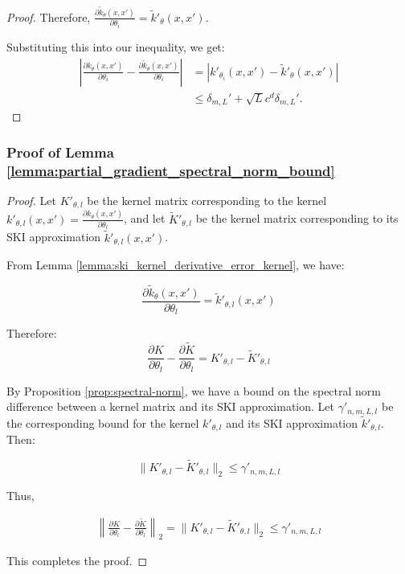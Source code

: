 \begin{proof}
Therefore, $\frac{\partial \tilde{k}_{\theta}(x,x')}{\partial \theta_i} = \tilde{k}'_{\theta}(x, x')$.

Substituting this into our inequality, we get:
\begin{align*}
\left\vert \frac{\partial k_{\theta}(x,x')}{\partial \theta_i}-\frac{\partial \tilde{k}_{\theta}(x,x')}{\partial \theta_i}\right\vert &= \left\vert k'_{\theta_i}(x, x') - \tilde{k}'_{\theta}(x, x') \right\vert \\
&\leq \delta_{m,L}'+\sqrt{L}c^d\delta_{m,L}'.
\end{align*}

\end{proof}

\subsubsection{Proof of Lemma \ref{lemma:partial_gradient_spectral_norm_bound}}\label{section:proof_partial_gradient_spectral_norm_bound}
\partialgradientspectralnormbound*
\begin{proof}
Let $K'_{\theta,l}$ be the kernel matrix corresponding to the kernel $k'_{\theta,l}(x,x') = \frac{\partial k_{\theta}(x,x')}{\partial \theta_l}$, and let $\tilde{K}'_{\theta,l}$ be the kernel matrix corresponding to its SKI approximation $\tilde{k}'_{\theta,l}(x,x')$.

From Lemma \ref{lemma:ski_kernel_derivative_error_kernel}, we have:

\begin{equation}
\frac{\partial \tilde{k}_{\theta}(x,x')}{\partial \theta_l} = \tilde{k}'_{\theta,l}(x, x')
\end{equation}

Therefore:
\begin{equation}
\frac{\partial K}{\partial \theta_l} - \frac{\partial \tilde{K}}{\partial \theta_l} = K'_{\theta,l} - \tilde{K}'_{\theta,l}
\end{equation}

By Proposition \ref{prop:spectral-norm}, we have a bound on the spectral norm difference between a kernel matrix and its SKI approximation. Let $\gamma'_{n,m,L,l}$ be the corresponding bound for the kernel $k'_{\theta,l}$ and its SKI approximation $\tilde{k}'_{\theta,l}$. Then:

\begin{equation}
\| K'_{\theta,l} - \tilde{K}'_{\theta,l} \|_2 \leq \gamma'_{n,m,L,l}
\end{equation}

Thus,

\begin{align*}
\left\| \frac{\partial K}{\partial \theta_l} - \frac{\partial \tilde{K}}{\partial \theta_l} \right\|_2 = \| K'_{\theta,l} - \tilde{K}'_{\theta,l} \|_2 \leq \gamma'_{n,m,L,l}
\end{align*}

This completes the proof.
\end{proof}

